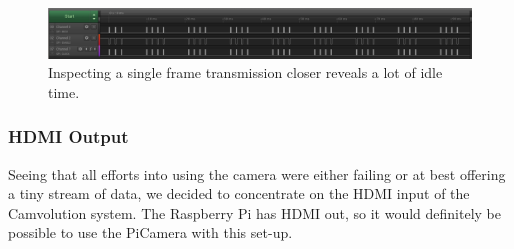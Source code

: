 \begin{figure}
    \centering
    \includegraphics[width=\linewidth]{img/logic/1frame}
    \caption{Inspecting a single frame transmission closer reveals a lot of idle time.}
    \label{fig:Logic1Frame}
\end{figure}

\subsubsection{HDMI Output}
Seeing that all efforts into using the camera were either failing or at best offering a tiny stream of data,
we decided to concentrate on the HDMI input of the Camvolution system.
The Raspberry Pi has HDMI out, so it would definitely be possible to use the PiCamera with this set-up.
